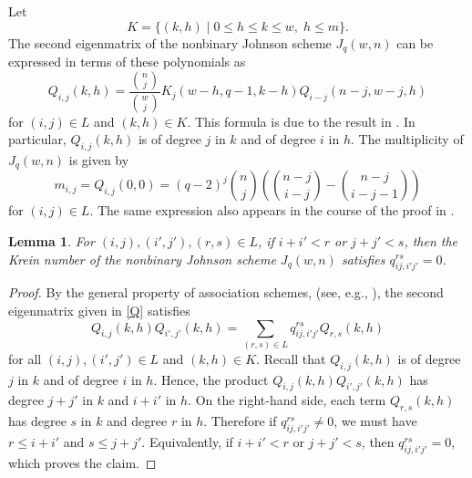 \documentclass[a4paper, 11pt]{article}
\newtheorem{lemma}[theorem]{Lemma}
\theoremstyle{definition}
\begin{document}
Let
\[
K = \{(k,h) \mid 0 \le h \le k \le w,\; h \le m\}.
\]
The second eigenmatrix of the nonbinary Johnson scheme $J_q(w, n)$ can be expressed in terms of these polynomials as
\begin{equation}\label{Q}
Q_{i,j}(k,h) = \frac{\binom{n}{j}}{\binom{w}{j}}K_j(w-h,q-1,k-h)Q_{i-j}(n-j,w-j,h)
\end{equation}
for $(i,j) \in L$ and $(k,h) \in K$.
This formula is due to the result in \cite[Theorem~2]{TAG85}.
In particular, $Q_{i,j}(k,h)$ is of degree $j$ in $k$ and of degree $i$ in $h$.
The multiplicity of $J_q(w, n)$ is given by
\begin{equation}\label{m}
m_{i,j} = Q_{i,j}(0,0) = (q-2)^j \binom{n}{j} \left(\binom{n-j}{i-j} - \binom{n-j}{i-j-1}\right)
\end{equation}
for $(i,j) \in L$.
The same expression also appears in the course of the proof in \cite[Lemma~2.3]{Z21}.

\begin{lemma}\label{lem:vanish}
For $(i,j), (i',j'), (r,s) \in L$,
if $i+i' < r$ or $j+j' < s$, then the Krein number of the nonbinary Johnson scheme $J_q(w, n)$ satisfies $q_{ij,i'j'}^{rs} = 0$.
\end{lemma}
\begin{proof}
By the general property of association schemes,
(see, e.g., \cite[Theorem~2.22\,(7)]{BBIT21}), 
the second eigenmatrix given in \eqref{Q} satisfies
\[
Q_{i,j}(k,h) Q_{i',j'}(k,h) = \sum_{(r,s) \in L} q_{ij,i'j'}^{rs} Q_{r,s}(k,h)
\]
for all $(i,j), (i',j') \in L$ and $(k,h) \in K$.
Recall that $Q_{i,j}(k,h)$ is of degree $j$ in $k$ and of degree $i$ in $h$.
Hence, the product $Q_{i,j}(k,h) Q_{i',j'}(k,h)$ has degree $j+j'$ in $k$ and $i+i'$ in $h$.
On the right-hand side, each term $Q_{r,s}(k,h)$ has degree $s$ in $k$ and degree $r$ in $h$.
Therefore if $q_{ij,i'j'}^{rs} \neq 0$, we must have  $r \le i+i'$ and $s \le j+j'$.
Equivalently, if $i+i' < r$ or $j+j' < s$, then $q_{ij,i'j'}^{rs} = 0$, which proves the claim.
\end{proof}
\end{document}
